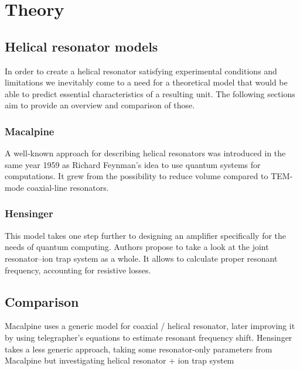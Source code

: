 \chapter{Theory}

\section{Helical resonator models}
In order to create a helical resonator satisfying experimental conditions and limitations we inevitably come to a need for a theoretical model that would be able to predict essential characteristics of a resulting unit. The following sections aim to provide an overview and comparison of those.

\subsection{Macalpine}
A well-known approach \cite{Macalpine2000} for describing helical resonators was introduced in the same year 1959 as Richard Feynman's idea \cite{Feynman1960} to use quantum systems for computations. It grew from the possibility to reduce volume compared to TEM-mode coaxial-line resonators.

\subsection{Hensinger}
This model \cite{Siverns2012} takes one step further to designing an amplifier specifically for the needs of quantum computing. Authors propose to take a look at the joint resonator--ion trap system as a whole. It allows to calculate proper resonant frequency, accounting for resistive losses.


\section{Comparison}

Macalpine uses a generic model for coaxial / helical resonator, later improving it by using telegrapher's equations to estimate resonant frequency shift. Hensinger takes a less generic approach, taking some resonator-only parameters from Macalpine but investigating helical resonator + ion trap system